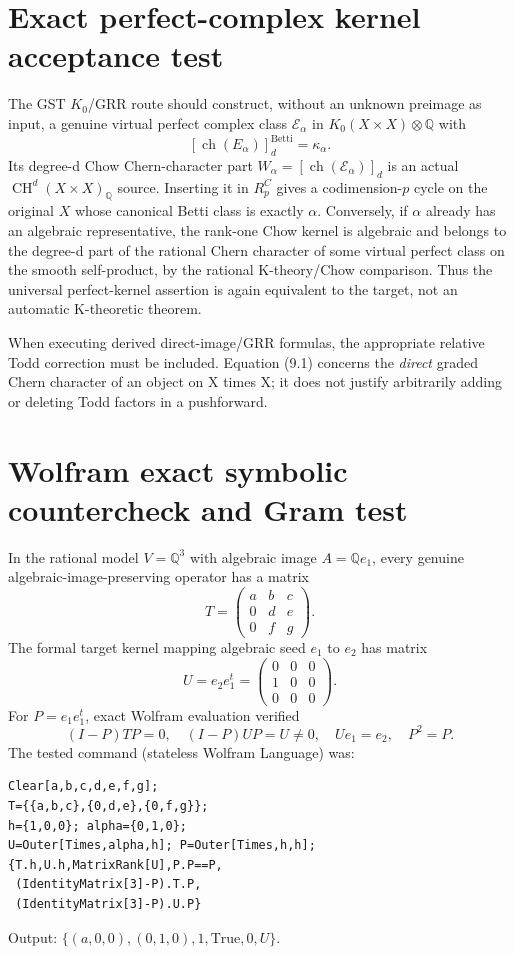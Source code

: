 \documentclass[11pt,a4paper]{article}
\newcommand{\Q}{\mathbb Q}
\newcommand{\CH}{\operatorname{CH}}
\begin{document}
\section{Exact perfect-complex kernel acceptance test}
The GST \(K_0\)/GRR route should construct, without an
unknown preimage as input, a genuine virtual perfect
complex class \(\mathcal E_\alpha\) in
\(K_0(X\times X)\otimes\Q\) with
\[
 \boxed{
   [\operatorname{ch}(E_\alpha)]_d^{\mathrm{Betti}}
          =\kappa_\alpha.}\tag{9.1}
\]
Its degree-d Chow Chern-character part
\(W_\alpha=[\operatorname{ch}(\mathcal E_\alpha)]_d\) is an actual
\(\CH^d(X\times X)_\Q\) source. Inserting it in
\(R^C_p\) gives a codimension-\(p\) cycle on the original \(X\)
whose canonical Betti class is exactly \(\alpha\).
Conversely, if \(\alpha\) already has an algebraic
representative, the rank-one Chow kernel is
algebraic and belongs to the degree-d part of the
rational Chern character of some virtual perfect
class on the smooth self-product, by the rational
K-theory/Chow comparison.  Thus the universal
perfect-kernel assertion is again equivalent to
the target, not an automatic K-theoretic theorem.

When executing derived direct-image/GRR formulas,
the appropriate relative Todd correction must be
included.  Equation (9.1) concerns the \emph{direct}
graded Chern character of an object on X times X;
it does not justify arbitrarily adding or deleting
Todd factors in a pushforward.

\section{Wolfram exact symbolic countercheck and Gram test}
In the rational model \(V=\Q^3\) with algebraic image
\(A=\Q e_1\), every genuine algebraic-image-preserving
operator has a matrix
\[
 T=\begin{pmatrix}a&b&c\\0&d&e\\0&f&g\end{pmatrix}.
\]
The formal target kernel mapping algebraic seed
\(e_1\) to \(e_2\) has matrix
\[
 U=e_2e_1^t=
 \begin{pmatrix}0&0&0\\1&0&0\\0&0&0\end{pmatrix}.
\]
For \(P=e_1e_1^t\), exact Wolfram evaluation verified
\[
 (I-P)TP=0,\quad (I-P)UP=U\ne0,\quad
 Ue_1=e_2,\quad P^2=P.
\]
The tested command (stateless Wolfram Language) was:
\begin{verbatim}
Clear[a,b,c,d,e,f,g];
T={{a,b,c},{0,d,e},{0,f,g}};
h={1,0,0}; alpha={0,1,0};
U=Outer[Times,alpha,h]; P=Outer[Times,h,h];
{T.h,U.h,MatrixRank[U],P.P==P,
 (IdentityMatrix[3]-P).T.P,
 (IdentityMatrix[3]-P).U.P}
\end{verbatim}
Output: \(\{(a,0,0),(0,1,0),1,\mathrm{True},0,U\}\).
\end{document}
